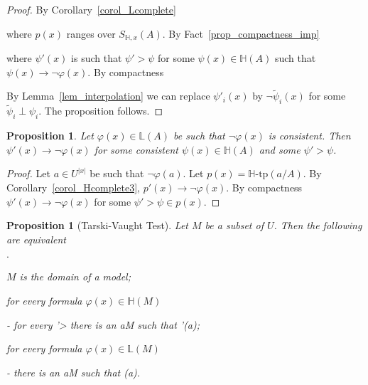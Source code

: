 \documentclass[11pt,oneside]{amsart}
\newcommand{\mylabel}[1]{{#1}\hfill}
\renewenvironment{itemize}
  {\begin{list}{$\cdot$}{%
   \setlength{\parskip}{0mm}
   \setlength{\topsep}{.2\baselineskip}
   \setlength{\rightmargin}{0mm}
   \setlength{\listparindent}{0mm}
   \setlength{\itemindent}{0mm}
   \setlength{\labelwidth}{3ex}
   \setlength{\itemsep}{.2\baselineskip}
   \setlength{\parsep}{.2\baselineskip}
   \setlength{\partopsep}{0mm}
   \setlength{\labelsep}{1ex}
   \setlength{\leftmargin}{\labelwidth+\labelsep}
   \let\makelabel\mylabel}}{%
   \end{list}}
\theoremstyle{plain}
\newtheorem{proposition}[theorem]{Proposition}
\theoremstyle{remark}
\begin{document}
\begin{proof}
  By Corollary~\ref{corol_Lcomplete}


  where $p(x)$ ranges over $S_{\mathds{H},x}(A)$.
  By Fact~\ref{prop_compactness_imp}


  where $\psi'(x)$ is such that $\psi'>\psi$ for some $\psi(x)\in 
  \mathds{H}(A)$ such that $\psi(x)\rightarrow\neg\varphi(x)$.
  By compactness

 
  By Lemma~\ref{lem_interpolation} we can replace $\psi'_i(x)$ by $\neg\tilde{\psi}_i(x)$ for some $\tilde{\psi}_i\perp\psi_i$. 
  The proposition follows.
\end{proof}

\begin{proposition}\label{prop_LHapprox2}
  Let $\varphi(x)\in\mathds{L}(A)$ be such that $\neg\varphi(x)$ is consistent.
  Then  $\psi'(x)\rightarrow\neg\varphi(x)$ for some consistent $\psi(x)\in\mathds{H}(A)$ and some $\psi'>\psi$.\hfill\qedsymbol
\end{proposition}



\begin{proof}
  Let $a\in U^{|x|}$ be such that $\neg\varphi(a)$.
  Let $p(x)=\mathds{H}\mbox{-tp}(a/A)$.
  By Corollary~\ref{corol_Hcomplete3}, $p'(x)\rightarrow\neg\varphi(x)$. 
  By compactness  $\psi'(x)\rightarrow\neg\varphi(x)$ for some $\psi'>\psi\in p(x)$. 
\end{proof}

\begin{proposition}[Tarski-Vaught Test] 
  Let $M$ be a subset of $U$.
  Then the following are equivalent
  \begin{itemize}
    \item[1.] $M$ is the domain of a model;
    \item[2.] for every formula $\varphi(x)\in\mathds{H}(M)$
    
    \noindent\kern-\leftmargin
    {\textrm{ for every }\varphi'>\varphi\textrm{ there is an }a\in M\textrm{ such that }\varphi'(a);}
    \item[3.] for every formula $\varphi(x)\in\mathds{L}(M)$
    
    \noindent\kern-\leftmargin
    {\textrm{ there is an }a\in M\textrm{ such that }\neg\varphi(a).}
    
  \end{itemize}
\end{proposition}
\end{document}
